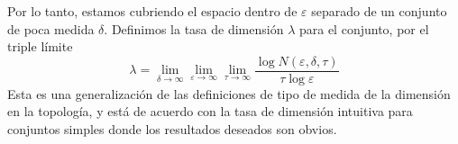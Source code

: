 \begin{appendices}
Por lo tanto, estamos cubriendo el espacio dentro de $\varepsilon$
separado de un conjunto de poca medida $\delta$. Definimos la tasa de
dimensi\'on $\lambda$ para el conjunto, por el triple l\'imite
\begin{equation} 
\lambda = 
\lim_{\delta \to \infty} 
\lim_{\varepsilon \to \infty} 
\lim_{\tau \to \infty} 
\frac{\log N(\varepsilon, \delta, \tau)}{\tau \log \varepsilon} 
\end{equation} 
Esta es una generalizaci\'on de las definiciones de tipo de medida de
la dimensi\'on en la topolog\'ia, y est\'a de acuerdo con la tasa de
dimensi\'on intuitiva para conjuntos simples donde los resultados
deseados son obvios.

\end{appendices}
